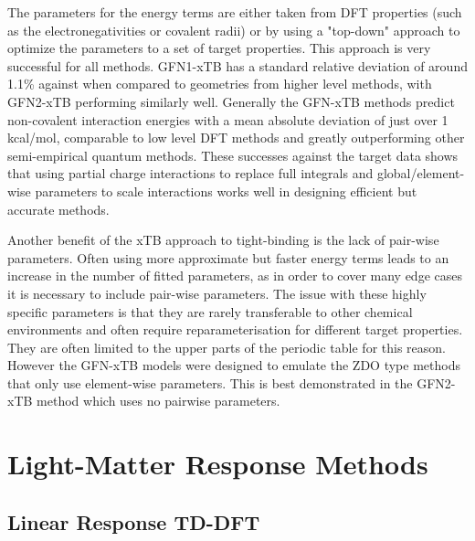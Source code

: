 The parameters for the energy terms are either taken from DFT properties (such
as the electronegativities or covalent radii) or by using a "top-down" approach
to optimize the parameters to a set of target properties. This approach is very 
successful for all methods. GFN1-xTB  has a standard relative deviation of around
1.1\% against when compared to geometries from higher level methods, with GFN2-xTB
performing similarly well. Generally the GFN-xTB methods predict non-covalent interaction
energies with a mean absolute deviation of just over 1 kcal/mol, comparable to low
level DFT methods and greatly outperforming other semi-empirical quantum methods.
These successes against the target data shows that using partial charge interactions 
to replace full integrals and global/element-wise parameters to scale interactions
works well in designing efficient but accurate methods.

Another benefit of the xTB approach to tight-binding is the lack of pair-wise parameters.
Often using more approximate but faster energy terms leads to an increase in the
number of fitted parameters, as in order to cover many edge cases it is necessary
to include pair-wise parameters. The issue with these highly specific parameters 
is that they are rarely transferable to other chemical environments and often require
reparameterisation for different target properties. They are often limited to the 
upper parts of the periodic table for this reason. However the GFN-xTB models were
designed to emulate the ZDO type methods that only use element-wise parameters.
This is best demonstrated in the GFN2-xTB method which uses no pairwise parameters.

\section{Light-Matter Response Methods}
\label{sec:response_theories}

\subsection{Linear Response TD-DFT}
\label{subsec:tddft}

